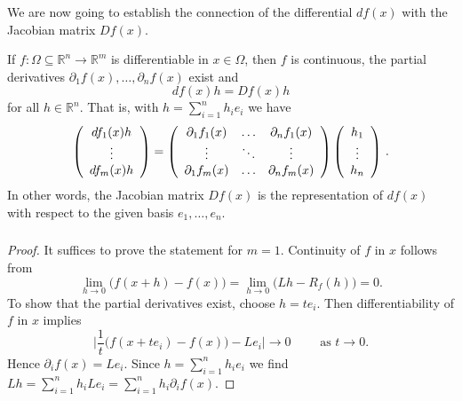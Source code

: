  \begin{frame}[fragile] \frametitle{}
  We are now going to establish the connection of the differential $df(x)$ with the 
  Jacobian matrix $Df(x)$.


If $f\colon\Omega \subseteq \mathbb{R}^n \rightarrow \mathbb{R}^m$
is differentiable in $x \in \Omega$, then $f$ is continuous, the partial derivatives
$\partial_1 f(x), \dots, \partial_n f(x)$ exist and
\[
df(x)h = Df(x)h
\]
for all $h \in \mathbb{R}^n$.
That is, with $h = \sum_{i=1}^n h_i e_i$ we have 
 \[ 
    \left( \begin{array}{c}
         df_1(x)h\\
	       \vdots\\
	             df_m(x)h 
		         \end{array} \right) 
			 =
			 \left( \begin{array}{c c c}
			       \partial_1 f_1(x) & \ldots & \partial_n f_1(x)\\
			             \vdots & \ddots & \vdots\\
				           \partial_1 f_m(x) & \ldots & \partial_n f_m(x)
					       \end{array} \right)
			    \left( \begin{array}{c}
			          h_1\\
				        \vdots\\
					     h_n
					          \end{array} \right) \,.\]
						  In other words, the Jacobian matrix $Df(x)$ is the
						  representation of $df(x)$ with respect to the 
						  given basis $e_1, \ldots, e_n$.



\end{frame}

 \begin{frame}[fragile] \frametitle{}
\begin{proof}
It suffices to prove
the statement for $m=1$. Continuity of $f$ in $x$ follows from
\[
\lim_{h \to 0}\big (f(x+h)-f(x)\big)
= \lim_{h \to 0} \big( Lh - R_f(h)\big)=0.
\]
To show that the partial derivatives exist,  choose $h=te_i$. Then differentiability of $f$ in $x$ implies
\[
\Big|
\frac{1}{t} \big ( f(x+t e_i) - f(x) \big ) - L e_i \Big| \to 0 \qquad \text{ as } t \to 0.
\]
Hence $\partial_i f(x) = L e_i$. 
Since $h=\sum_{i=1}^n h_i e_i$ we find $Lh= \sum_{i=1}^n h_i Le_i = \sum_{i=1}^n h_i \partial_i f(x)$.
\end{proof}

\end{frame}

